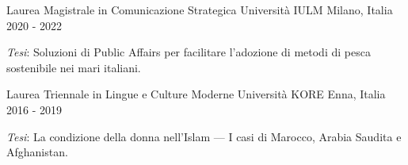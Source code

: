 
\begin{cventries}

\cventry
{Laurea Magistrale in Comunicazione Strategica} %
{Università IULM} %
{Milano, Italia} %
{2020 - 2022} %
{
\begin{cvitems}
\item \textit{Tesi}: Soluzioni di Public Affairs per facilitare l'adozione di metodi di pesca sostenibile nei mari italiani.
\end{cvitems}
}

\cventry
{Laurea Triennale in Lingue e Culture Moderne} %
{Università KORE} %
{Enna, Italia} %
{2016 - 2019} %
{
\begin{cvitems}
\item \textit{Tesi}: La condizione della donna nell'Islam  ---  I casi di Marocco, Arabia Saudita e Afghanistan.
\end{cvitems}
}

\end{cventries}
